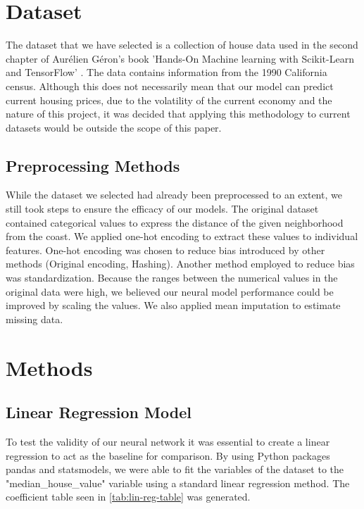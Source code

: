 \documentclass[11pt]{article}
\begin{document}
\section{Dataset}

The dataset that we have selected is a collection of house data used in the second chapter of Aurélien Géron's book 'Hands-On Machine learning with Scikit-Learn and TensorFlow' \cite{Geron2022}. The data contains information from the 1990 California census. Although this does not necessarily mean that our model can predict current housing prices, due to the volatility of the current economy and the nature of this project, it was decided that applying this methodology to current datasets would be outside the scope of this paper.

\subsection{Preprocessing Methods}

While the dataset we selected had already been preprocessed to an extent, we still took steps to ensure the efficacy of our models. The original dataset contained categorical values to express the distance of the given neighborhood from the coast. 
We applied one-hot encoding to extract these values to individual features. One-hot encoding was chosen to reduce bias introduced by other methods (Original encoding, Hashing). Another method employed to reduce bias was standardization. Because the ranges between the numerical values in the original data were high, we believed our neural model performance could be improved by scaling the values. We also applied mean imputation to estimate missing data.


\section{Methods}

\subsection{Linear Regression Model}

To test the validity of our neural network it was essential to create a linear regression to act as the baseline for comparison. By using Python packages pandas and statsmodels, we were able to fit the variables of the dataset to the "median\_house\_value" variable using a standard linear regression method. The coefficient table seen in \autoref{tab:lin-reg-table} was generated.
\end{document}

